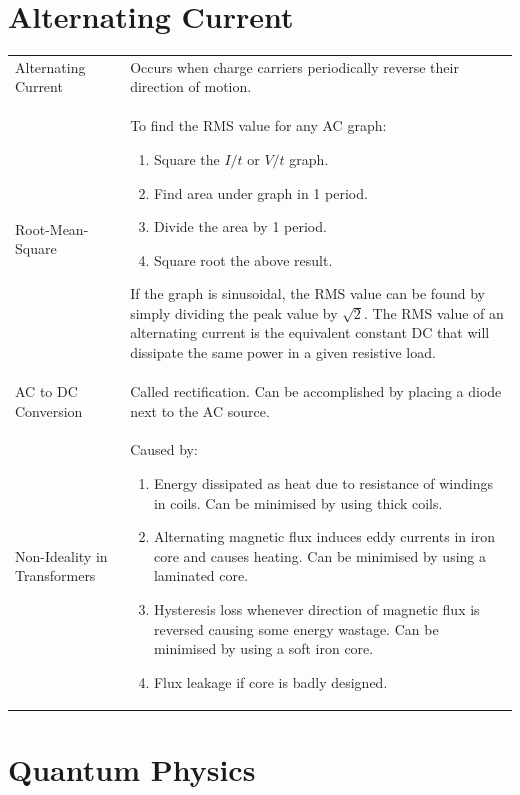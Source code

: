 \documentclass[a4paper,11pt]{article}
\begin{document}
	\section{Alternating Current}
	\begin{center}
		\renewcommand{\arraystretch}{1.2}
		\begin{tabular}{@{} l p{10cm} @{}}
			\toprule
			Alternating Current & Occurs when charge carriers periodically reverse their direction of motion.\\
			Root-Mean-Square & To find the RMS value for any AC graph: \begin{enumerate}
				\item Square the $I/t$ or $V/t$ graph.
				\item Find area under graph in 1 period.
				\item Divide the area by 1 period.
				\item Square root the above result.
			\end{enumerate}
			If the graph is sinusoidal, the RMS value can be found by simply dividing the peak value by $\sqrt{2}$. The RMS value of an alternating current is the equivalent constant DC that will dissipate the same power in a given resistive load.\\
			AC to DC Conversion & Called rectification. Can be accomplished by placing a diode next to the AC source.\\
			Non-Ideality in Transformers & Caused by:
			\begin{enumerate}
				\item Energy dissipated as heat due to resistance of windings in coils. Can be minimised by using thick coils. 
				\item Alternating magnetic flux induces eddy currents in iron core and causes heating. Can be minimised by using a laminated core.
				\item Hysteresis loss whenever direction of magnetic flux is reversed causing some energy wastage. Can be minimised by using a soft iron core.
				\item Flux leakage if core is badly designed.
			\end{enumerate}\\
			\bottomrule
		\end{tabular}
	\end{center}
	\section{Quantum Physics}
\end{document}
